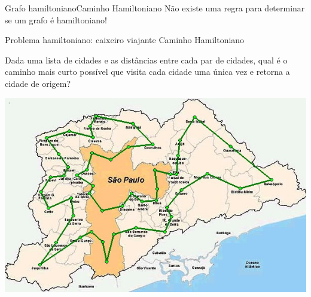\documentclass[t]{beamer}
\begin{document}

\begin{ftst}{Grafo hamiltoniano}{Caminho Hamiltoniano}
\vone
Não existe uma regra para determinar se um grafo é hamiltoniano!
\vone
\centering



\end{ftst}


\begin{ftst}{Problema hamiltoniano: caixeiro viajante }{Caminho Hamiltoniano}

Dada uma lista de cidades e as distâncias entre cada par de cidades, qual é o caminho mais curto possível que visita cada cidade uma única vez e retorna a cidade de origem?

\vone
\centering
\includegraphics[scale=0.5]{Figuras/caixeiro.jpg}

\end{ftst}

\end{document}
